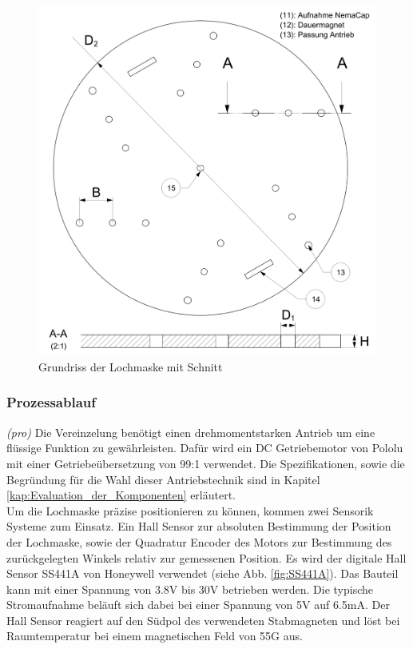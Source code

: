 	\begin{figure}[H]
	\includegraphics[scale=0.65]{Illustrationen/6-Umsetzung/detail_lochmaske.jpg}
	\caption{Grundriss der Lochmaske mit Schnitt}
	\label{fig:detail_lochmaske}
	\end{figure}

\subsubsection{Prozessablauf}
\textit{(pro)} Die Vereinzelung benötigt einen drehmomentstarken Antrieb um eine flüssige Funktion zu gewährleisten. Dafür wird ein DC Getriebemotor von Pololu mit einer Getriebeübersetzung von 99:1 verwendet. Die Spezifikationen, sowie die Begründung für die Wahl dieser Antriebstechnik sind in Kapitel \ref{kap:Evaluation_der_Komponenten} erläutert.
\\ Um die Lochmaske präzise positionieren zu können, kommen zwei Sensorik Systeme zum Einsatz. Ein Hall Sensor zur absoluten Bestimmung der Position der Lochmaske, sowie der Quadratur Encoder des Motors zur Bestimmung des zurückgelegten Winkels relativ zur gemessenen Position. Es wird der digitale Hall Sensor SS441A von Honeywell verwendet (siehe Abb. \ref{fig:SS441A}). Das Bauteil kann mit einer Spannung von 3.8V bis 30V betrieben werden. Die typische Stromaufnahme beläuft sich dabei bei einer Spannung von 5V auf 6.5mA. Der Hall Sensor reagiert auf den Südpol des verwendeten Stabmagneten und löst bei Raumtemperatur bei einem magnetischen Feld von 55G aus.

